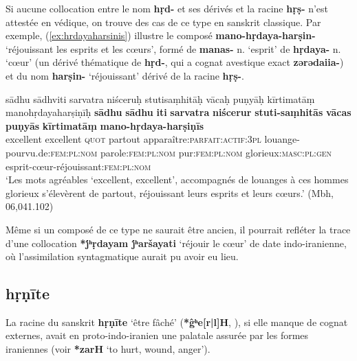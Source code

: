 \documentclass{article}
\newcommand{\ipa}[1]{{\phon\textbf{#1}}}
\begin{document}

Si aucune collocation entre le nom \ipa{hṛd-} et ses dérivés et la racine \ipa{hṛṣ-} n'est attestée en védique, on trouve des cas de ce type en sanskrit classique. Par exemple, (\ref{ex:hrdayaharsinis}) illustre le composé \ipa{mano-hṛdaya-harṣin-} `réjouissant les esprits et les cœurs', formé de \ipa{manas-} n. `esprit' de \ipa{hṛdaya-} n. `cœur' (un dérivé thématique de \ipa{hṛd-}, qui a cognat avestique exact \ipa{zərədaiia-}) et du nom \ipa{harṣin-} `réjouissant' dérivé de la racine \ipa{hṛṣ-}. 

\begin{exe}
\ex \label{ex:hrdayaharsinis}
\glt sādhu sādhviti sarvatra niśceruḥ stutisaṃhitāḥ
\glt vācaḥ puṇyāḥ kīrtimatāṃ manohṛdayaharṣiṇīḥ
\gll 
\ipa{sādhu} \ipa{sādhu} \ipa{iti} \ipa{sarvatra} \ipa{niścerur} \ipa{stuti-saṃhitās} 
\ipa{vācas} \ipa{puṇyās} \ipa{kīrtimatāṃ} \ipa{mano-hṛdaya-harṣiṇīs}\\
excellent excellent \textsc{quot} partout apparaître:\textsc{parfait:actif:3pl} louange-pourvu.de:\textsc{fem:pl:nom} parole:\textsc{fem:pl:nom}
pur:\textsc{fem:pl:nom} glorieux:\textsc{masc:pl:gen} esprit-cœur-réjouissant:\textsc{fem:pl:nom} \\ 
\glt `Les mots agréables `excellent, excellent', accompagnés de louanges à ces  hommes glorieux s'élevèrent de partout, réjouissant leurs esprits et leurs cœurs.' (Mbh, 06,041.102)
\end{exe}
Même si un composé de ce type ne saurait être ancien, il pourrait refléter la trace d'une collocation \ipa{*j́ʰṛdayam j́ʰaršayati} `réjouir le cœur' de date indo-iranienne, où l'assimilation syntagmatique aurait pu avoir eu lieu.


\subsection{\ipa{hṛṇīte}} \label{sec:hrnite}
La racine du sanskrit \ipa{hṛṇīte} `être fâché' (\ipa{*ĝʰe[r|l]H}, \citealt[178]{liv}), si elle manque de cognat externes, avait en proto-indo-iranien une palatale assurée par les formes iraniennes (voir \citealt[469]{cheung07dictionary} \ipa{*zarH} ‘to hurt, wound, anger’). 
\end{document}
